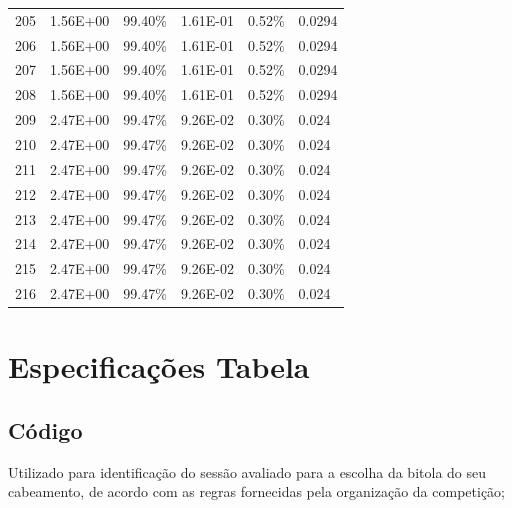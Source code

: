 \documentclass{article}
\begin{document}
\begin{landscape}
\begin{table}[]
\begin{tabular}{llllll}
205    & 1.56E+00                    & 99.40\%         & 1.61E-01            & 0.52\%                          & 0.0294             \\
206    & 1.56E+00                    & 99.40\%         & 1.61E-01            & 0.52\%                          & 0.0294             \\
207    & 1.56E+00                    & 99.40\%         & 1.61E-01            & 0.52\%                          & 0.0294             \\
208    & 1.56E+00                    & 99.40\%         & 1.61E-01            & 0.52\%                          & 0.0294             \\
209    & 2.47E+00                    & 99.47\%         & 9.26E-02            & 0.30\%                          & 0.024              \\
210    & 2.47E+00                    & 99.47\%         & 9.26E-02            & 0.30\%                          & 0.024              \\
211    & 2.47E+00                    & 99.47\%         & 9.26E-02            & 0.30\%                          & 0.024              \\
212    & 2.47E+00                    & 99.47\%         & 9.26E-02            & 0.30\%                          & 0.024              \\
213    & 2.47E+00                    & 99.47\%         & 9.26E-02            & 0.30\%                          & 0.024              \\
214    & 2.47E+00                    & 99.47\%         & 9.26E-02            & 0.30\%                          & 0.024              \\
215    & 2.47E+00                    & 99.47\%         & 9.26E-02            & 0.30\%                          & 0.024              \\
216    & 2.47E+00                    & 99.47\%         & 9.26E-02            & 0.30\%                          & 0.024             
\end{tabular}
\end{table}
\end{landscape}

\section{Especificações Tabela}

\subsection{Código}
Utilizado para identificação do sessão avaliado para a escolha da bitola do seu cabeamento, de acordo com as regras fornecidas pela organização da competição;
\end{document}
